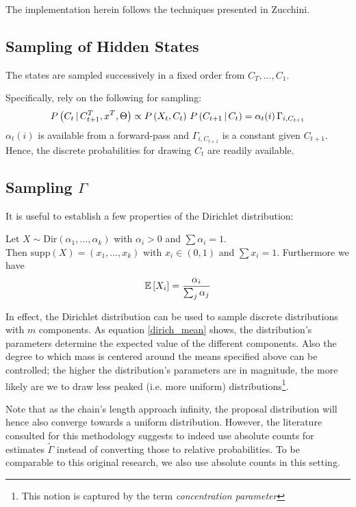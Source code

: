 The implementation herein follows the techniques presented in Zucchini\cite{zucchini}.

\subsection{Sampling of Hidden States}
	The states are sampled successively in a fixed order from $C_T, \dots, C_1$. 
	
	Specifically, rely on the following for sampling:
	\[
		P\left(C_t \, | \, C_{t+1}^T, x^{T}, \Theta\right) \propto 
		P \left(X_t, C_t\right) \, P\left(C_{t+1} \, | \, C_t\right) = \alpha_t(i) \, \Gamma_{i, C_{t+1}} 
	\]
	$\alpha_t(i)$ is available from a forward-pass and $\Gamma_{i, C_{t+1}}$ is a constant given $C_{t+1}$. Hence, the discrete probabilities for drawing $C_t$ are readily available. 
	
	
 \subsection{Sampling $\Gamma$}
 	It is useful to establish a few properties of the Dirichlet distribution:
	 \begin{lemma}
	 	Let $X \sim \text{Dir}(\alpha_1, \dots, \alpha_k)$ with $\alpha_i > 0$ and $\sum \alpha_i  = 1$.\\
	 	
	 	Then $\text{supp}(X) = (x_1, \dots, x_k)$ with $x_i \in (0, 1)$ and $\sum x_i = 1$. Furthermore we have
	 	\begin{align}
	 	\mathbb{E}\left[ X_i \right] = \frac{\alpha_i}{\sum_{j} \alpha_j}
	 	\label{dirich_mean}
	 	\end{align}
	 \end{lemma}
 	
 	In effect, the Dirichlet distribution can be used to sample discrete distributions with $m$ components. As equation \ref{dirich_mean} shows, the distribution's parameters determine the expected value of the different components. Also the degree to which mass is centered around the means specified above can be controlled; the higher the distribution's parameters are in magnitude, the more likely are we to draw less peaked (i.e. more uniform) distributions\footnote{This notion is captured by the term \textit{concentration parameter}}. 
 	
 	Note that as the chain's length approach infinity, the proposal distribution will hence also converge towards a uniform distribution. However, the literature consulted for this methodology suggests to indeed use absolute counts for estimates $\tilde{\Gamma}$ instead of converting those to relative probabilities. To be comparable to this original research, we also use absolute counts in this setting. 
 
